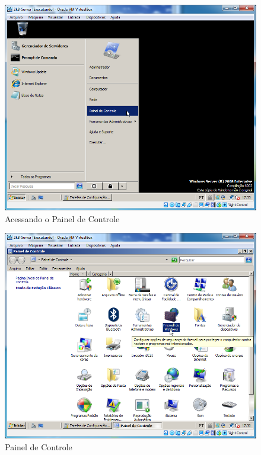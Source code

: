 \documentclass[10pt]{article}
\begin{document}
\begin{figure}[H]
    \centering
    \caption{Acessando o Painel de Controle}
    \label{fig:4211}
    \includegraphics[width=\linewidth]{images/configuracao_windows/windows_server/001.png}
\end{figure}
\begin{figure}[H]
    \centering
    \caption{Painel de Controle}
    \label{fig:4212}
    \includegraphics[width=\linewidth]{images/configuracao_windows/windows_server/002.png}
\end{figure}
\end{document}
